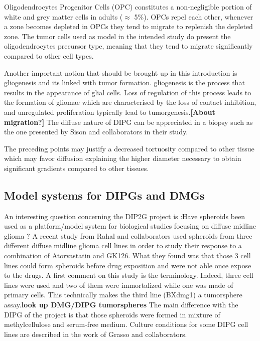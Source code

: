 \documentclass[11pt,a4paper]{article}
\begin{document}
Oligodendrocytes Progenitor Cells (OPC) constitutes a non-negligible portion of white and grey matter cells in adults ($\approx$ 5\%). OPCs repel each other, whenever a zone becomes depleted in OPCs they tend to migrate to replenish the depleted zone. The tumor cells used as model in the intended study do present the oligodendrocytes precursor type, meaning that they tend to migrate significantly compared to other cell types.

Another important notion that should be brought up in this introduction is gliogenesis and its linked with tumor formation. gliogenesis is the process that results in the appearance of glial cells. Loss of regulation of this process leads to the formation of gliomae which are characterised by the loss of contact inhibition, and unregulated proliferation typically lead to tumorgenesis.\textbf{[About migration?]} The diffuse nature of DIPG can be appreciated in a biopsy such as the one presented by Sison and collaborators in their study. \cite{Sison2017}

The preceding points may justify a decreased tortuosity compared to other tissue which may favor diffusion explaining the higher diameter necessary to obtain significant gradients compared to other tissues.


\subsection{Model systems for DIPGs and DMGs}
An interesting question concerning the DIP2G project is :Have spheroids been used as a platform/model system for biological studies focusing on diffuse midline glioma ? A recent study from Rahal and collaborators used spheroids from three different diffuse midline glioma cell lines in order to study their response to a combination of Atorvastatin and GK126.\cite{Rahal2022} What they found was that those 3 cell lines could form spheroids before drug exposition and were not able once expose to the drugs. A first comment on this study is the terminology. Indeed, three cell lines were used and two of them were immortalized while one was made of primary cells. This technically makes the third line (BXdmg1) a tumorsphere assay.\textbf{look up DMG/DIPG tumorspheres} The main difference with the DIPG of the project is that those spheroids were formed in mixture of methylcellulose and serum-free medium. Culture conditions for some DIPG cell lines are described in the work of Grasso and collaborators. \cite{Grasso2015}%
\end{document}
